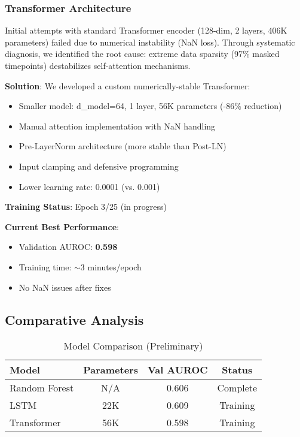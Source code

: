 \documentclass[conference]{IEEEtran}
\begin{document}
\subsubsection{Transformer Architecture}

Initial attempts with standard Transformer encoder (128-dim, 2 layers, 406K parameters) failed due to numerical instability (NaN loss). Through systematic diagnosis, we identified the root cause: extreme data sparsity (97\% masked timepoints) destabilizes self-attention mechanisms.

\textbf{Solution}: We developed a custom numerically-stable Transformer:
\begin{itemize}
    \item Smaller model: d\_model=64, 1 layer, 56K parameters (-86\% reduction)
    \item Manual attention implementation with NaN handling
    \item Pre-LayerNorm architecture (more stable than Post-LN)
    \item Input clamping and defensive programming
    \item Lower learning rate: 0.0001 (vs. 0.001)
\end{itemize}

\textbf{Training Status}: Epoch 3/25 (in progress)

\textbf{Current Best Performance}:
\begin{itemize}
    \item Validation AUROC: \textbf{0.598}
    \item Training time: $\sim$3 minutes/epoch
    \item No NaN issues after fixes
\end{itemize}

\subsection{Comparative Analysis}

\begin{table}[h]
\centering
\caption{Model Comparison (Preliminary)}
\label{tab:comparison}
\begin{tabular}{lccc}
\toprule
\textbf{Model} & \textbf{Parameters} & \textbf{Val AUROC} & \textbf{Status} \\
\midrule
Random Forest & N/A & 0.606 & Complete \\
LSTM & 22K & 0.609 & Training \\
Transformer & 56K & 0.598 & Training \\
\bottomrule
\end{tabular}
\end{table}
\end{document}
